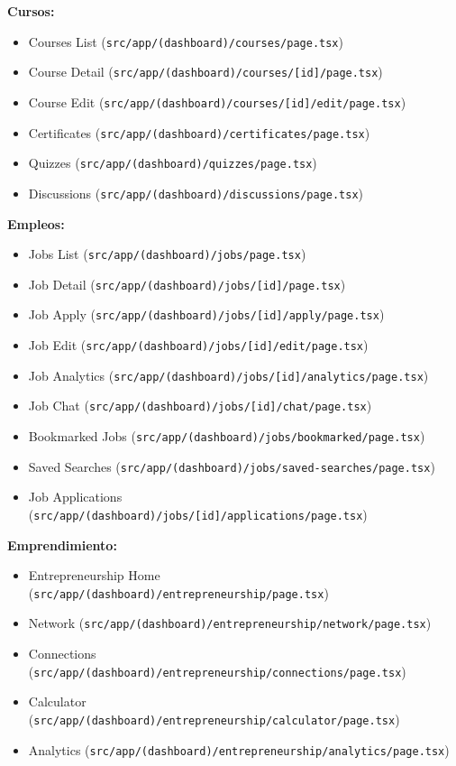 \documentclass[12pt,a4paper]{article}
\begin{document}
\begin{enumerate}
\textbf{Cursos:}
\begin{itemize}
    \item Courses List (\texttt{src/app/(dashboard)/courses/page.tsx})
    \item Course Detail (\texttt{src/app/(dashboard)/courses/[id]/page.tsx})
    \item Course Edit (\texttt{src/app/(dashboard)/courses/[id]/edit/page.tsx})
    \item Certificates (\texttt{src/app/(dashboard)/certificates/page.tsx})
    \item Quizzes (\texttt{src/app/(dashboard)/quizzes/page.tsx})
    \item Discussions (\texttt{src/app/(dashboard)/discussions/page.tsx})
\end{itemize}

\textbf{Empleos:}
\begin{itemize}
    \item Jobs List (\texttt{src/app/(dashboard)/jobs/page.tsx})
    \item Job Detail (\texttt{src/app/(dashboard)/jobs/[id]/page.tsx})
    \item Job Apply (\texttt{src/app/(dashboard)/jobs/[id]/apply/page.tsx})
    \item Job Edit (\texttt{src/app/(dashboard)/jobs/[id]/edit/page.tsx})
    \item Job Analytics (\texttt{src/app/(dashboard)/jobs/[id]/analytics/page.tsx})
    \item Job Chat (\texttt{src/app/(dashboard)/jobs/[id]/chat/page.tsx})
    \item Bookmarked Jobs (\texttt{src/app/(dashboard)/jobs/bookmarked/page.tsx})
    \item Saved Searches (\texttt{src/app/(dashboard)/jobs/saved-searches/page.tsx})
    \item Job Applications (\texttt{src/app/(dashboard)/jobs/[id]/applications/page.tsx})
\end{itemize}

\textbf{Emprendimiento:}
\begin{itemize}
    \item Entrepreneurship Home (\texttt{src/app/(dashboard)/entrepreneurship/page.tsx})
    \item Network (\texttt{src/app/(dashboard)/entrepreneurship/network/page.tsx})
    \item Connections (\texttt{src/app/(dashboard)/entrepreneurship/connections/page.tsx})
    \item Calculator (\texttt{src/app/(dashboard)/entrepreneurship/calculator/page.tsx})
    \item Analytics (\texttt{src/app/(dashboard)/entrepreneurship/analytics/page.tsx})
\end{itemize}


\end{enumerate}
\end{document}
